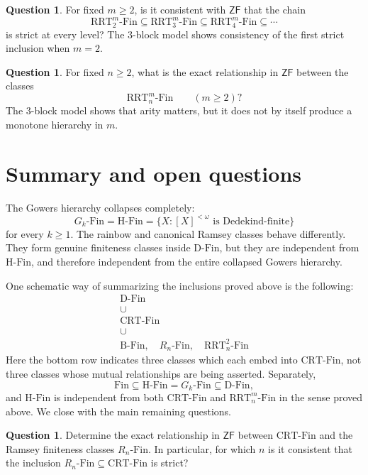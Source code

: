 \documentclass[10pt,a4paper]{amsart}
\theoremstyle{definition}
\newtheorem{question}[theorem]{Question}
\newcommand{\ZF}{\mathsf{ZF}}
\newcommand{\Fin}{\mathrm{Fin}}
\newcommand{\DFin}{\mathrm{D\text{-}Fin}}
\newcommand{\BFin}{\mathrm{B\text{-}Fin}}
\newcommand{\HFin}{\mathrm{H\text{-}Fin}}
\newcommand{\RnFin}[1]{R_{#1}\text{-}\mathrm{Fin}}
\newcommand{\RRT}{\mathrm{RRT}}
\newcommand{\CRT}{\mathrm{CRT}}
\newcommand{\RRTFin}[2]{\RRT^{#1}_{#2}\text{-}\mathrm{Fin}}
\newcommand{\CRTFin}{\CRT\text{-}\mathrm{Fin}}
\begin{document}
\begin{question}
For fixed \(m\geq 2\), is it consistent with \(\ZF\) that the chain
\[
    \RRTFin{m}{2}
    \subseteq
    \RRTFin{m}{3}
    \subseteq
    \RRTFin{m}{4}
    \subseteq\cdots
\]
is strict at every level?  The \(3\)-block model shows consistency of the first strict inclusion when \(m=2\).
\end{question}

\begin{question}\label{q:m-direction}
For fixed \(n\geq 2\), what is the exact relationship in \(\ZF\) between the classes
\[
    \RRTFin{m}{n}\qquad (m\geq 2)?
\]
The \(3\)-block model shows that arity matters, but it does not by itself produce a monotone hierarchy in \(m\).
\end{question}

\section{Summary and open questions}

The Gowers hierarchy collapses completely:
\[
    G_k\text{-}\Fin=\HFin=\{X:[X]^{<\omega}\text{ is Dedekind-finite}\}
\]
for every \(k\geq 1\).  The rainbow and canonical Ramsey classes behave differently.  They form genuine finiteness classes inside \(\DFin\), but they are independent from \(\HFin\), and therefore independent from the entire collapsed Gowers hierarchy.

One schematic way of summarizing the inclusions proved above is the following:
\[
\begin{array}{c}
\DFin \\[0.6em]
\cup \\[0.2em]
\CRTFin \\[0.6em]
\cup \\[0.2em]
\BFin,\quad \RnFin{n},\quad \RRTFin{2}{n}
\end{array}
\]
Here the bottom row indicates three classes which each embed into \(\CRTFin\), not three classes whose mutual relationships are being asserted.  Separately,
\[
    \Fin\subseteq \HFin=G_k\text{-}\Fin\subseteq \DFin,
\]
and \(\HFin\) is independent from both \(\CRTFin\) and \(\RRTFin{m}{n}\) in the sense proved above.
We close with the main remaining questions.

\begin{question}
Determine the exact relationship in \(\ZF\) between \(\CRTFin\) and the Ramsey finiteness classes \(\RnFin{n}\).  In particular, for which \(n\) is it consistent that the inclusion \(\RnFin{n}\subseteq\CRTFin\) is strict?
\end{question}
\end{document}
